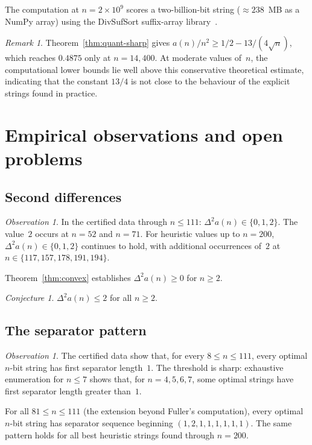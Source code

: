 \documentclass[11pt,a4paper]{article}
\theoremstyle{plain}
\theoremstyle{definition}
\theoremstyle{remark}
\newtheorem{remark}[theorem]{Remark}
\newtheorem{observation}[theorem]{Observation}
\newtheorem{conjecture}[theorem]{Conjecture}
\newcommand{\DDa}{\Delta^2 a}
\begin{document}
The computation at $n = 2 \times 10^9$ scores a two-billion-bit
string ($\approx 238$~MB as a NumPy array) using the DivSufSort
suffix-array library~\cite{pydivsufsort}.

\begin{remark}
  Theorem~\ref{thm:quant-sharp} gives
  $a(n)/n^2 \ge 1/2 - 13/(4\sqrt{n})$, which reaches $0.4875$ only at
  $n = 14{,}400$.  At moderate values of~$n$, the computational lower
  bounds lie well above this conservative theoretical estimate,
  indicating that the constant $13/4$ is not close to the behaviour of
  the explicit strings found in practice.
\end{remark}

\section{Empirical observations and open problems}\label{sec:observations}

\subsection{Second differences}

\begin{observation}\label{obs:dda}
  In the certified data through $n \le 111$:
  $\DDa(n) \in \{0, 1, 2\}$.  The value~$2$ occurs at
  $n = 52$ and $n = 71$.  For heuristic values up to $n = 200$,
  $\DDa(n) \in \{0, 1, 2\}$ continues to hold, with additional
  occurrences of~$2$ at $n \in \{117, 157, 178, 191, 194\}$.
\end{observation}

Theorem~\ref{thm:convex} establishes $\DDa(n) \ge 0$ for $n \ge 2$.

\begin{conjecture}\label{conj:dda}
  $\DDa(n) \le 2$ for all $n \ge 2$.
\end{conjecture}

\subsection{The separator pattern}

\begin{observation}\label{obs:seps}
  The certified data show that, for every $8 \le n \le 111$, every
  optimal $n$-bit string has first separator length~$1$.
  The threshold is sharp: exhaustive enumeration for $n \le 7$ shows
  that, for $n = 4,5,6,7$, some optimal strings have first separator
  length greater than~$1$.

  For all $81 \le n \le 111$ (the extension beyond Fuller's
  computation), every optimal $n$-bit string has separator sequence
  beginning $(1, 2, 1, 1, 1, 1, 1, 1)$.  The same pattern holds for
  all best heuristic strings found through $n = 200$.
\end{observation}
\end{document}
